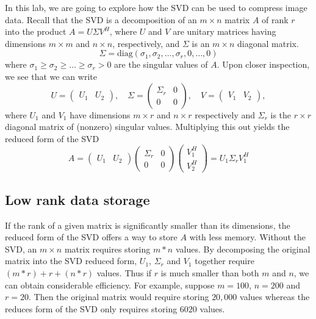 

In this lab, we are going to explore how the SVD can be used to compress image data.  
Recall that the SVD is a decomposition of an $m \times n$ matrix $A$ of rank $r$ into the product $A = U \Sigma V^H$, where $U$ and $V$ are unitary matrices having dimensions $m \times m$ and $n \times n$, respectively, and $\Sigma$ is an $m \times n$ diagonal matrix.
\begin{equation*}
\Sigma = \mbox{diag}(\sigma_1,\sigma_2,\ldots,\sigma_r,0,\ldots,0)
\end{equation*}
where $\sigma_1 \geq \sigma_2 \geq \ldots \geq \sigma_r > 0$ are the singular values of $A$.
Upon closer inspection, we see that we can write
\begin{equation*}
U = \begin{pmatrix}U_1 & U_2\end{pmatrix}, \quad \Sigma =
\begin{pmatrix}\Sigma_r & 0\\0 & 0\end{pmatrix}, \quad V =
\begin{pmatrix}V_1 & V_2\end{pmatrix},
\end{equation*}
where $U_1$ and $V_1$ have dimensions $m\times r$ and $n\times r$ respectively and $\Sigma_r$ is the $r\times r$ diagonal matrix of (nonzero) singular values.
Multiplying this out yields the reduced form of the SVD
\begin{equation*}
A =
\begin{pmatrix}U_1 & U_2\end{pmatrix}
\begin{pmatrix}\Sigma_r & 0\\0 & 0\end{pmatrix}
\begin{pmatrix}V^H_1 \\ V^H_2\end{pmatrix} =
U_1 \Sigma_r V_1^H
\end{equation*}

\subsection*{Low rank data storage}
If the rank of a given matrix is significantly smaller than its dimensions, the reduced form of the SVD offers a way to store $A$ with less memory.
Without the SVD, an $m\times n$ matrix requires storing $m*n$ values.
By decomposing the original matrix into the SVD reduced form, $U_1$, $\Sigma_r$ and $V_1$ together require $(m*r)+r+(n*r)$ values.
Thus if $r$ is much smaller than both $m$ and $n$, we can obtain considerable efficiency.
For example, suppose $m=100$, $n=200$ and $r=20$. 
Then the original matrix would require storing $20,000$ values whereas the reduces form of the SVD only requires storing $6020$ values.

